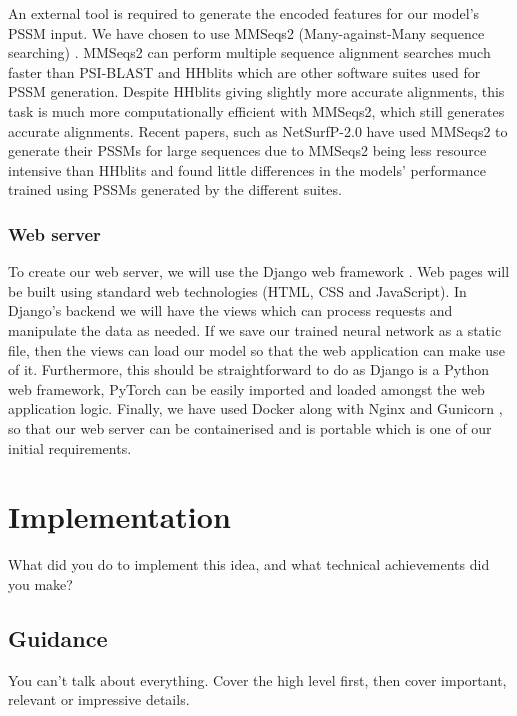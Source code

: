 \documentclass{l4proj}
\begin{document}
An external tool is required to generate the encoded features for our model's PSSM input. We have chosen to use MMSeqs2 (Many-against-Many sequence searching) \citep{Steinegger:17}. MMSeqs2 can perform multiple sequence alignment searches much faster than PSI-BLAST \citep{Altschul:97} and HHblits \citep{Remmert:12} which are other software suites used for PSSM generation. Despite HHblits giving slightly more accurate alignments, this task is much more computationally efficient with MMSeqs2, which still generates accurate alignments. Recent papers, such as NetSurfP-2.0 \citep{Klausen:19} have used MMSeqs2 to generate their PSSMs for large sequences due to MMSeqs2 being less resource intensive than HHblits and found little differences in the models' performance trained using PSSMs generated by the different suites.

\subsection{Web server}

To create our web server, we will use the Django web framework \citep{Django:05}. Web pages will be built using standard web technologies (HTML, CSS and JavaScript). In Django’s backend we will have the views which can process requests and manipulate the data as needed. If we save our trained neural network as a static file, then the views can load our model so that the web application can make use of it. Furthermore, this should be straightforward to do as Django is a Python web framework, PyTorch can be easily imported and loaded amongst the web application logic. 
Finally, we have used Docker \citep{Docker:14} along with Nginx \citep{Nginx:08} and Gunicorn \citep{gunicorn:wiki}, so that our web server can be containerised and is portable which is one of our initial requirements. 

\chapter{Implementation}
What did you do to implement this idea, and what technical achievements did you make?
\section{Guidance}
You can't talk about everything. Cover the high level first, then cover important, relevant or impressive details.
\end{document}
